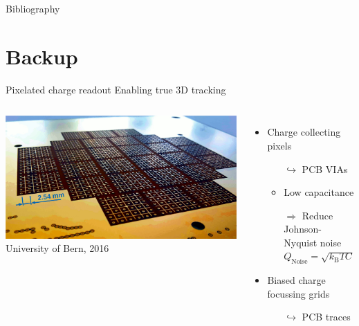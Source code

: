 \documentclass[]{beamer}
\newcommand*{\m}{\mathrm}
\newcommand*{\emphcoltitle}{blue}
\begin{document}
\begin{frame}[allowframebreaks]{Bibliography}
	\printbibliography
\end{frame}

\section{Backup}

\begin{frame}{Pixelated charge readout}{\color{\emphcoltitle} Enabling true 3D tracking}
	\begin{columns}[c]
		\centering
		\includegraphics[width=\textwidth]{viper/pixies}\\
		{\tiny University of Bern, 2016}\\
		\begin{itemize}
			\item Charge collecting pixels
			\begin{itemize}
				\item[$\hookrightarrow$] PCB VIAs
				\item Low capacitance
				\item[$\Rightarrow$] Reduce Johnson-Nyquist noise $Q_{\m{Noise}} = \sqrt{k_{\m{B}}TC}$
			\end{itemize}
			\item Biased charge focussing grids
			\begin{itemize}
				\item[$\hookrightarrow$] PCB traces
			\end{itemize}
		\end{itemize}
	\end{columns}
\end{frame}
\end{document}
